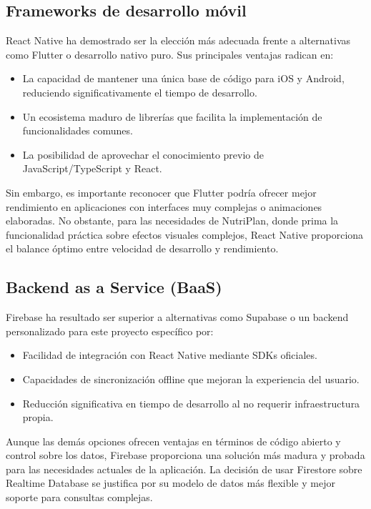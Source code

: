 \documentclass[twoside, openright, 11pt]{report}
\begin{document}
\begin{enumerate}
	\subsection*{Frameworks de desarrollo móvil}
	React Native ha demostrado ser la elección más adecuada frente a alternativas como Flutter o desarrollo nativo puro. Sus principales ventajas radican en:
	\begin{itemize}
		\item La capacidad de mantener una única base de código para iOS y Android, reduciendo significativamente el tiempo de desarrollo.
		\item Un ecosistema maduro de librerías que facilita la implementación de funcionalidades comunes.
		\item La posibilidad de aprovechar el conocimiento previo de JavaScript/TypeScript y React.
	\end{itemize}
	
	Sin embargo, es importante reconocer que Flutter podría ofrecer mejor rendimiento en aplicaciones con interfaces muy complejas o animaciones elaboradas. No obstante, para las necesidades de NutriPlan, donde prima la funcionalidad práctica sobre efectos visuales complejos, React Native proporciona el balance óptimo entre velocidad de desarrollo y rendimiento.
	
	\subsection*{Backend as a Service (BaaS)}
	Firebase ha resultado ser superior a alternativas como Supabase o un backend personalizado para este proyecto específico por:
	\begin{itemize}
		\item Facilidad de integración con React Native mediante SDKs oficiales.
		\item Capacidades de sincronización offline que mejoran la experiencia del usuario.
		\item Reducción significativa en tiempo de desarrollo al no requerir infraestructura propia.
	\end{itemize}
	
	Aunque las demás opciones ofrecen ventajas en términos de código abierto y control sobre los datos, Firebase proporciona una solución más madura y probada para las necesidades actuales de la aplicación. La decisión de usar Firestore sobre Realtime Database se justifica por su modelo de datos más flexible y mejor soporte para consultas complejas.
	

\end{enumerate}
\end{document}
